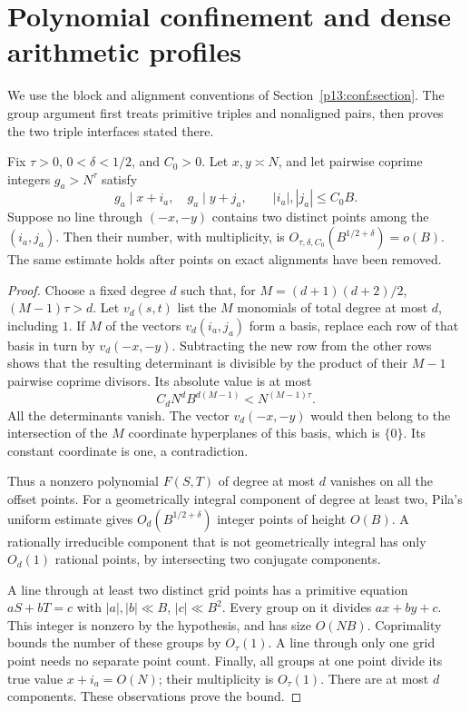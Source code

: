 \section{Polynomial confinement and dense arithmetic profiles}
\label{p14:comp:confinement}

We use the block and alignment conventions of
Section~\ref{p13:conf:section}.  The group argument first treats
primitive triples and nonaligned pairs, then proves the two triple
interfaces stated there.

\begin{lemma}
\label{p13:conf:groups}
Fix \(\tau>0\), \(0<\delta<1/2\), and \(C_0>0\).
Let \(x,y\asymp N\), and let pairwise coprime integers
\(g_a>N^\tau\) satisfy
\[
 g_a\mid x+i_a,\quad g_a\mid y+j_a,\qquad
 |i_a|,|j_a|\le C_0B.
\]
Suppose no line through \((-x,-y)\) contains two
distinct points among the \((i_a,j_a)\).
Then their number, with multiplicity, is
\(O_{\tau,\delta,C_0}(B^{1/2+\delta})=o(B)\).
The same estimate holds after points on exact alignments
have been removed.
\end{lemma}

\begin{proof}
Choose a fixed degree \(d\) such that, for
\(M=(d+1)(d+2)/2\), \((M-1)\tau>d\).
Let \(v_d(s,t)\) list the \(M\) monomials of total degree
at most \(d\), including \(1\).
If \(M\) of the vectors \(v_d(i_a,j_a)\) form a basis,
replace each row of that basis in turn by \(v_d(-x,-y)\).
Subtracting the new row from the other rows shows that
the resulting determinant is divisible by the product
of their \(M-1\) pairwise coprime divisors.
Its absolute value is at most
\[
 C_dN^dB^{d(M-1)}<N^{(M-1)\tau}.
\]
All the determinants vanish.
The vector \(v_d(-x,-y)\) would then belong to the
intersection of the \(M\) coordinate hyperplanes of
this basis, which is \(\{0\}\). Its constant coordinate
is one, a contradiction.

Thus a nonzero polynomial \(F(S,T)\) of degree at most
\(d\) vanishes on all the offset points.
For a geometrically integral component of degree at least
two, Pila's uniform estimate
\cite[Theorem~A]{pila1995} gives
\(O_d(B^{1/2+\delta})\) integer points of height \(O(B)\).
A rationally irreducible component that is not geometrically
integral has only \(O_d(1)\) rational points, by intersecting
two conjugate components.

A line through at least two distinct grid points has a
primitive equation \(aS+bT=c\) with
\(|a|,|b|\ll B\), \(|c|\ll B^2\).
Every group on it divides \(ax+by+c\).
This integer is nonzero by the hypothesis, and has size
\(O(NB)\). Coprimality bounds the number of these groups
by \(O_\tau(1)\). A line through only one grid point
needs no separate point count.
Finally, all groups at one point divide its true value
\(x+i_a=O(N)\); their multiplicity is \(O_\tau(1)\).
There are at most \(d\) components. These observations
prove the bound.
\end{proof}

